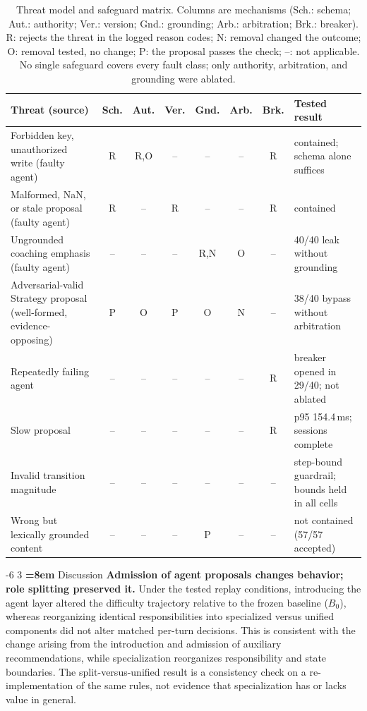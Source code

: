 \documentclass[runningheads,a4paper]{llncs}
\makeatletter
\renewcommand\section{\@startsection{section}{1}{\z@}%
                       {-6\p@ \@plus -1\p@ \@minus -1\p@}%
                       {3\p@ \@plus 1\p@ \@minus 1\p@}%
                       {\normalfont\large\bfseries\boldmath
                        \rightskip=\z@ \@plus 8em\pretolerance=10000 }}
\makeatother
\begin{document}
\begin{table}[!htbp]
\caption{Threat model and safeguard matrix. Columns are mechanisms (Sch.: schema; Aut.: authority; Ver.: version; Gnd.: grounding; Arb.: arbitration; Brk.: breaker). R: rejects the threat in the logged reason codes; N: removal changed the outcome; O: removal tested, no change; P: the proposal passes the check; --: not applicable. No single safeguard covers every fault class; only authority, arbitration, and grounding were ablated.}
\label{tab:threat}
\centering\scriptsize
\begin{tabular}{@{}L{3.1cm}ccccccL{3.1cm}@{}}
\toprule
Threat (source) & Sch. & Aut. & Ver. & Gnd. & Arb. & Brk. & Tested result \\
\midrule
Forbidden key, unauthorized write (faulty agent) & R & R,O & -- & -- & -- & R & contained; schema alone suffices \\
Malformed, NaN, or stale proposal (faulty agent) & R & -- & R & -- & -- & R & contained \\
Ungrounded coaching emphasis (faulty agent) & -- & -- & -- & R,N & O & -- & 40/40 leak without grounding \\
Adversarial-valid Strategy proposal (well-formed, evidence-opposing) & P & O & P & O & N & -- & 38/40 bypass without arbitration \\
Repeatedly failing agent & -- & -- & -- & -- & -- & R & breaker opened in 29/40; not ablated \\
Slow proposal & -- & -- & -- & -- & -- & R & p95 154.4\,ms; sessions complete \\
Invalid transition magnitude & -- & -- & -- & -- & -- & -- & step-bound guardrail; bounds held in all cells \\
Wrong but lexically grounded content & -- & -- & -- & P & -- & -- & not contained (57/57 accepted) \\
\bottomrule
\end{tabular}
\end{table}

\section{Discussion}
\textbf{Admission of agent proposals changes behavior; role splitting preserved it.} Under the tested replay conditions, introducing the agent layer altered the difficulty trajectory relative to the frozen baseline ($B_0$), whereas reorganizing identical responsibilities into specialized versus unified components did not alter matched per-turn decisions. This is consistent with the change arising from the introduction and admission of auxiliary recommendations, while specialization reorganizes responsibility and state boundaries. The split-versus-unified result is a consistency check on a re-implementation of the same rules, not evidence that specialization has or lacks value in general.
\end{document}
